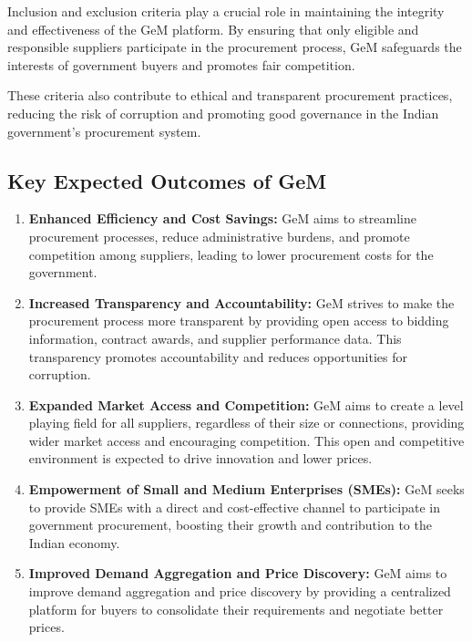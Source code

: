 Inclusion and exclusion criteria play a crucial role in maintaining the integrity and effectiveness of the GeM platform. By ensuring that only eligible and responsible suppliers participate in the procurement process, GeM safeguards the interests of government buyers and promotes fair competition.

These criteria also contribute to ethical and transparent procurement practices, reducing the risk of corruption and promoting good governance in the Indian government's procurement system.


\subsection{Key Expected Outcomes of GeM}

\begin{enumerate}
    \item \textbf{Enhanced Efficiency and Cost Savings:} GeM aims to streamline procurement processes, reduce administrative burdens, and promote competition among suppliers, leading to lower procurement costs for the government.
    
    \item \textbf{Increased Transparency and Accountability:} GeM strives to make the procurement process more transparent by providing open access to bidding information, contract awards, and supplier performance data. This transparency promotes accountability and reduces opportunities for corruption.
    
    \item \textbf{Expanded Market Access and Competition:} GeM aims to create a level playing field for all suppliers, regardless of their size or connections, providing wider market access and encouraging competition. This open and competitive environment is expected to drive innovation and lower prices.
    
    \item \textbf{Empowerment of Small and Medium Enterprises (SMEs):} GeM seeks to provide SMEs with a direct and cost-effective channel to participate in government procurement, boosting their growth and contribution to the Indian economy.
    
    \item \textbf{Improved Demand Aggregation and Price Discovery:} GeM aims to improve demand aggregation and price discovery by providing a centralized platform for buyers to consolidate their requirements and negotiate better prices.
    

\end{enumerate}
